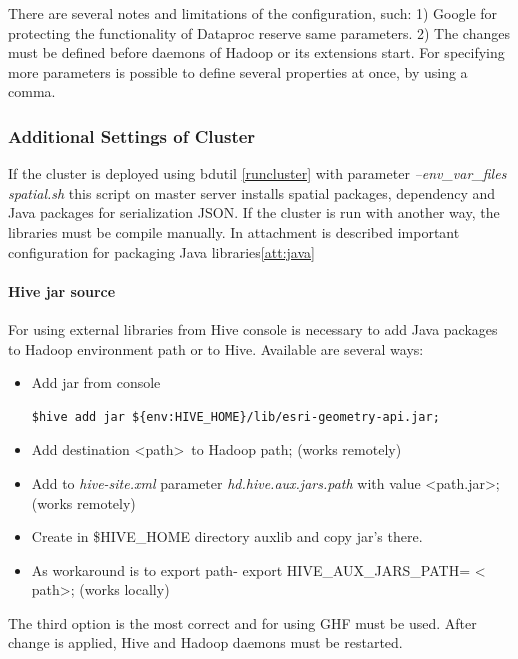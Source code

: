 \documentclass[a4paper,12pt,oneside]{report}
\begin{document}
    There are several notes and limitations  of the configuration, such: 1)
    Google for protecting the functionality of Dataproc reserve same parameters. 2) The
    changes must be defined before daemons of Hadoop or its extensions start.  For
    specifying more parameters is possible to define several properties at once, by
    using a comma.

	\subsubsection{Additional Settings of Cluster}
	If the cluster is deployed using bdutil \ref{runcluster}  with parameter
	\textit{--env\_var\_files spatial.sh} this script on master server installs
	spatial packages, dependency and Java packages for serialization JSON. If the
	cluster is run with another way, the libraries must be compile manually. In attachment is described important configuration for packaging Java libraries\ref{att:java}



	\paragraph{Hive jar source} For using external libraries from Hive console is necessary to add Java packages to Hadoop environment path or to Hive. Available are
	several ways:
	\begin{itemize}
		\item Add jar from console 
		\begin{footnotesize}
			\begin{lstlisting}[style=python]
$hive add jar ${env:HIVE_HOME}/lib/esri-geometry-api.jar;
			\end{lstlisting}
		\end{footnotesize}
		\item Add destination \textless path\textgreater~to Hadoop path; (works
		remotely)
		\item Add to \textit{hive-site.xml} parameter \textit{hd.hive.aux.jars.path} with
		value \textless path.jar\textgreater; (works remotely)
		\item Create in \$HIVE\_HOME directory auxlib and copy jar's there.
		\item As workaround is to export path-  export HIVE\_AUX\_JARS\_PATH= \textless
		path\textgreater; (works locally)
	\end{itemize}
	The third option is the most correct and for using GHF must be used. After
	change is applied, Hive and Hadoop daemons must be restarted. 
\end{document}
